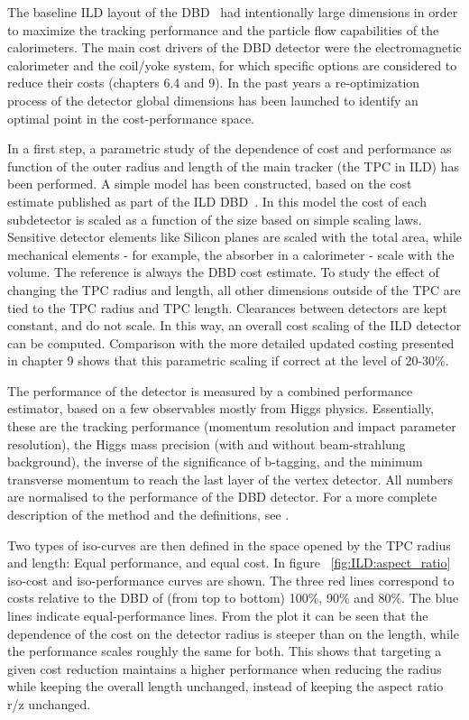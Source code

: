 The baseline ILD layout of the DBD~\cite{ild:bib:ilddbd} had intentionally large dimensions in order to maximize the tracking performance and the particle flow capabilities of the calorimeters. The main cost drivers of the DBD detector were the electromagnetic calorimeter and the coil/yoke system, for which specific options are considered to reduce their costs (chapters 6.4 and 9). In the past years a re-optimization process of the detector global dimensions has been launched to identify an optimal point in the cost-performance space.

In a first step, a parametric study \cite{Ref:bib:TPCOPT} of the dependence of cost and performance as function of the outer radius and length of the main tracker (the TPC in ILD) has been performed. 
A simple model has been constructed, based on the cost estimate published as part of the ILD DBD~\cite{ild:bib:ilddbd}. In this model the cost of each subdetector is scaled as a function of the size based on simple scaling laws. Sensitive detector elements like Silicon planes are scaled with the total area, while mechanical elements - for example, the absorber in a calorimeter - scale with the volume. The reference is always the DBD cost estimate. To study the effect of changing the TPC radius and length, all other dimensions outside of the TPC are tied to the TPC radius and TPC length. Clearances between detectors are kept constant, and do not scale. In this way, an overall cost scaling of the ILD detector can be computed. Comparison with the more detailed updated costing presented in chapter 9 shows that this parametric scaling if correct at the level of 20-30\%. 

The performance of the detector is measured by a combined performance estimator, based on a few observables mostly from Higgs physics. Essentially, these are the tracking performance (momentum resolution and impact parameter resolution), the Higgs mass precision (with and without beam-strahlung background), the inverse of the significance of b-tagging, and the minimum transverse momentum to reach the last layer of the vertex detector. All numbers are normalised to the performance of the DBD detector. For a more complete description of the method and the definitions, see \cite{Ref:bib:TPCOPT}. 

Two types of iso-curves are then defined in the space opened by the TPC radius and length: Equal performance, and equal cost. In figure ~\ref{fig:ILD:aspect_ratio} iso-cost and iso-performance curves are shown. The three red lines correspond to costs relative to the DBD of (from top to bottom) 100\%, 90\% and 80\%. The blue lines indicate equal-performance lines. From the plot it can be seen that the dependence of the cost on the detector radius is steeper than on the length, while the performance scales roughly the same for both. This shows that targeting a given cost reduction maintains a higher performance when reducing the radius while keeping the overall length unchanged, instead of keeping the aspect ratio r/z unchanged.  

